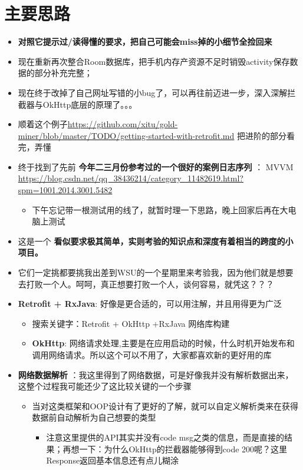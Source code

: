 \documentclass[9pt, b5paper]{article}
\begin{document}
\section{主要思路}
\label{sec-2}
\begin{itemize}
\item \textbf{对照它提示过/读得懂的要求，把自己可能会miss掉的小细节全捡回来}
\item 现在重新再次整合Room数据库，把手机内存产资源不足时销毁activity保存数据的部分补充完整；
\item 现在终于改掉了自己网址写错的小bug了，可以再往前迈进一步，深入深解拦截器与OkHttp底层的原理了。。。
\item 顺着这个例子\url{https://github.com/xitu/gold-miner/blob/master/TODO/getting-started-with-retrofit.md} 把进阶的部分看完，弄懂
\item 终于找到了先前 \textbf{今年二三月份参考过的一个很好的案例日志序列} ： MVVM \url{https://blog.csdn.net/qq_38436214/category_11482619.html?spm=1001.2014.3001.5482}
\begin{itemize}
\item 下午忘记带一根测试用的线了，就暂时理一下思路，晚上回家后再在大电脑上测试
\end{itemize}
\item 这是一个 \textbf{看似要求极其简单，实则考验的知识点和深度有着相当的跨度的小项目。}
\item 它们一定挑都要挑我出差到WSU的一个星期里来考验我，因为他们就是想要去打败一个人。呵呵，真正想要打败一个人，谈何容易，就凭这？？？
\item \textbf{Retrofit + RxJava}: 好像是更合适的，可以用注解，并且用得更为广泛
\begin{itemize}
\item 搜索关键字：Retrofit + OkHttp +RxJava 网络库构建
\item \textbf{OkHttp}: 网络请求处理,主要是在应用启动的时候，什么时机开始发布和调用网络请求。所以这个可以不用了，大家都喜欢新的更好用的库
\end{itemize}
\item \textbf{网络数据解析} ：我这里得到了网络数据，可是好像我并没有解析数据出来，这整个过程我可能还少了这比较关键的一个步骤
\begin{itemize}
\item 当对这类框架和OOP设计有了更好的了解，就可以自定义解析类来在获得数据前自动解析为自己想要的类型
\begin{itemize}
\item 注意这里提供的API其实并没有code msg之类的信息，而是直接的结果；再想一下：为什么OkHttp的拦截器能够得到code 200呢？这里Response返回基本信息还有点儿糊涂

\end{itemize}
\end{itemize}
\end{itemize}
\end{document}
